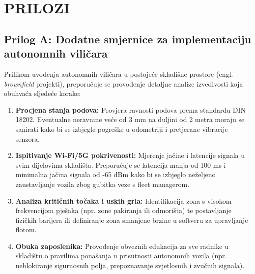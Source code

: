 \documentclass[12pt,a4paper]{article}
\begin{document}
\newpage
\section*{PRILOZI}

\subsection*{Prilog A: Dodatne smjernice za implementaciju autonomnih viličara}
Prilikom uvođenja autonomnih viličara u postojeće skladišne prostore (engl. \textit{brownfield} projekti), preporučuje se provođenje detaljne analize izvedivosti koja obuhvaća sljedeće korake:
\begin{enumerate}
    \item \textbf{Procjena stanja podova:} Provjera ravnosti podova prema standardu DIN 18202. Eventualne neravnine veće od 3 mm na duljini od 2 metra moraju se sanirati kako bi se izbjegle pogreške u odometriji i pretjerane vibracije senzora.
    \item \textbf{Ispitivanje Wi-Fi/5G pokrivenosti:} Mjerenje jačine i latencije signala u svim dijelovima skladišta. Preporučuje se latencija manja od 100 ms i minimalna jačina signala od -65 dBm kako bi se izbjeglo neželjeno zaustavljanje vozila zbog gubitka veze s fleet managerom.
    \item \textbf{Analiza kritičnih točaka i uskih grla:} Identifikacija zona s visokom frekvencijom pješaka (npr. zone pakiranja ili odmorišta) te postavljanje fizičkih barijera ili definiranje zona smanjene brzine u softveru za upravljanje flotom.
    \item \textbf{Obuka zaposlenika:} Provođenje obveznih edukacija za sve radnike u skladištu o pravilima ponašanja u prisutnosti autonomnih vozila (npr. neblokiranje sigurnosnih polja, prepoznavanje svjetlosnih i zvučnih signala).
\end{enumerate}
\end{document}
